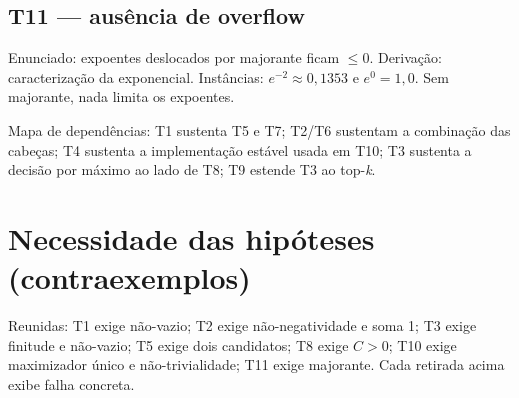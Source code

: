 \subsection{T11 --- ausência de overflow}
Enunciado: expoentes deslocados por majorante ficam $\leq0$. Derivação: caracterização da exponencial. Instâncias: $e^{-2}\approx0{,}1353$ e $e^{0}=1{,}0$. Sem majorante, nada limita os expoentes.
\par Mapa de dependências: T1 sustenta T5 e T7; T2/T6 sustentam a combinação das cabeças; T4 sustenta a implementação estável usada em T10; T3 sustenta a decisão por máximo ao lado de T8; T9 estende T3 ao top-\textit{k}.
\section{Necessidade das hipóteses (contraexemplos)}
Reunidas: T1 exige não-vazio; T2 exige não-negatividade e soma 1; T3 exige finitude e não-vazio; T5 exige dois candidatos; T8 exige $C>0$; T10 exige maximizador único e não-trivialidade; T11 exige majorante. Cada retirada acima exibe falha concreta.
